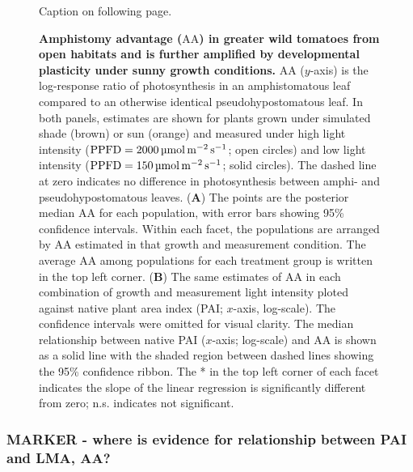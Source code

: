 \documentclass[
  letterpaper,
  DIV=11,
  numbers=noendperiod]{scrartcl}
\newcommand{\aax}{$\mathrm{AA}$}
\newcommand{\ppfdequals}[1]{$\mathrm{PPFD} = \qty{#1}{\micro\mol\raiseto{-2}\meter\raiseto{-1}\second}$}
\begin{document}
\begin{figure}


\caption{\label{fig-aa}Caption on following page.}

\end{figure}%

\addtocounter{figure}{-1}

\begin{figure}


\caption{\label{fig-aacap}\textbf{Amphistomy advantage (\aax{}) in greater wild tomatoes from open habitats and is further amplified by developmental plasticity under sunny growth conditions.}
\aax{} (\(y\)-axis) is the log-response ratio of photosynthesis in an
amphistomatous leaf compared to an otherwise identical
pseudohypostomatous leaf. In both panels, estimates are shown for plants
grown under simulated shade (brown) or sun (orange) and measured under
high light intensity (\ppfdequals{2000}; open circles) and low light
intensity (\ppfdequals{150}; solid circles). The dashed line at zero
indicates no difference in photosynthesis between amphi- and
pseudohypostomatous leaves. (\textbf{A}) The points are the posterior
median \aax{} for each population, with error bars showing 95\%
confidence intervals. Within each facet, the populations are arranged by
\aax{} estimated in that growth and measurement condition. The average
\aax{} among populations for each treatment group is written in the top
left corner. (\textbf{B}) The same estimates of \aax{} in each
combination of growth and measurement light intensity ploted against
native plant area index (PAI; \(x\)-axis, log-scale). The confidence
intervals were omitted for visual clarity. The median relationship
between native PAI (\(x\)-axis; log-scale) and \aax{} is shown as a
solid line with the shaded region between dashed lines showing the 95\%
confidence ribbon. The * in the top left corner of each facet indicates
the slope of the linear regression is significantly different from zero;
n.s. indicates not significant.}

\end{figure}%

\subsubsection{MARKER - where is evidence for relationship between PAI
and LMA,
AA?}\label{marker---where-is-evidence-for-relationship-between-pai-and-lma-aa}
\end{document}
